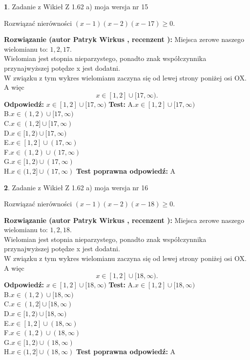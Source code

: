 \documentclass[12pt, a4paper]{article}
\theoremstyle{definition} %
\newtheorem{zad}{}
\newcommand{\zadStart}[1]{\begin{zad}#1\newline}
\newcommand{\zadStop}{\end{zad}}
\newcommand{\rozwStart}[2]{\noindent \textbf{Rozwiązanie (autor #1 , recenzent #2): }\newline}
\newcommand{\rozwStop}{\newline}
\newcommand{\odpStart}{\noindent \textbf{Odpowiedź:}\newline}
\newcommand{\odpStop}{\newline}
\newcommand{\testStart}{\noindent \textbf{Test:}\newline}
\newcommand{\testStop}{\newline}
\newcommand{\kluczStart}{\noindent \textbf{Test poprawna odpowiedź:}\newline}
\newcommand{\kluczStop}{\newline}
\begin{document}
\zadStart{Zadanie z Wikieł Z 1.62 a) moja wersja nr 15}

Rozwiązać nierówności $(x-1)(x-2)(x-17)\ge0$.
\zadStop
\rozwStart{Patryk Wirkus}{}
Miejsca zerowe naszego wielomianu to: $1, 2, 17$.\\
Wielomian jest stopnia nieparzystego, ponadto znak współczynnika przy\linebreak najwyższej potędze x jest dodatni.\\ W związku z tym wykres wielomianu zaczyna się od lewej strony poniżej osi OX. A więc $$x \in [1,2] \cup [17,\infty).$$
\rozwStop
\odpStart
$x \in [1,2] \cup [17,\infty)$
\odpStop
\testStart
A.$x \in [1,2] \cup [17,\infty)$\\
B.$x \in (1,2) \cup [17,\infty)$\\
C.$x \in (1,2] \cup [17,\infty)$\\
D.$x \in [1,2) \cup [17,\infty)$\\
E.$x \in [1,2] \cup (17,\infty)$\\
F.$x \in (1,2) \cup (17,\infty)$\\
G.$x \in [1,2) \cup (17,\infty)$\\
H.$x \in (1,2] \cup (17,\infty)$
\testStop
\kluczStart
A
\kluczStop



\zadStart{Zadanie z Wikieł Z 1.62 a) moja wersja nr 16}

Rozwiązać nierówności $(x-1)(x-2)(x-18)\ge0$.
\zadStop
\rozwStart{Patryk Wirkus}{}
Miejsca zerowe naszego wielomianu to: $1, 2, 18$.\\
Wielomian jest stopnia nieparzystego, ponadto znak współczynnika przy\linebreak najwyższej potędze x jest dodatni.\\ W związku z tym wykres wielomianu zaczyna się od lewej strony poniżej osi OX. A więc $$x \in [1,2] \cup [18,\infty).$$
\rozwStop
\odpStart
$x \in [1,2] \cup [18,\infty)$
\odpStop
\testStart
A.$x \in [1,2] \cup [18,\infty)$\\
B.$x \in (1,2) \cup [18,\infty)$\\
C.$x \in (1,2] \cup [18,\infty)$\\
D.$x \in [1,2) \cup [18,\infty)$\\
E.$x \in [1,2] \cup (18,\infty)$\\
F.$x \in (1,2) \cup (18,\infty)$\\
G.$x \in [1,2) \cup (18,\infty)$\\
H.$x \in (1,2] \cup (18,\infty)$
\testStop
\kluczStart
A
\kluczStop
\end{document}
